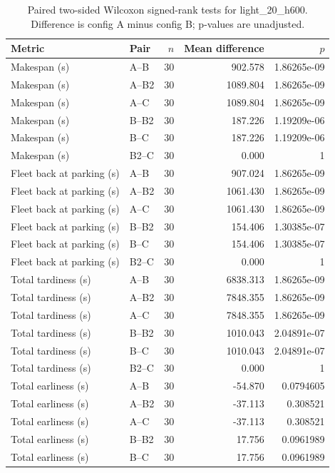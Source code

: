 \begin{table}[t]
\centering
\caption{Paired two-sided Wilcoxon signed-rank tests for light\_20\_h600. Difference is config A minus config B; p-values are unadjusted.}
\label{tab:light-20-h600-paired}
\begin{tabular}{llrrr}
\toprule
Metric & Pair & $n$ & Mean difference & $p$ \\
\midrule
Makespan (s) & A--B & 30 & 902.578 & 1.86265e-09 \\
Makespan (s) & A--B2 & 30 & 1089.804 & 1.86265e-09 \\
Makespan (s) & A--C & 30 & 1089.804 & 1.86265e-09 \\
Makespan (s) & B--B2 & 30 & 187.226 & 1.19209e-06 \\
Makespan (s) & B--C & 30 & 187.226 & 1.19209e-06 \\
Makespan (s) & B2--C & 30 & 0.000 & 1 \\
Fleet back at parking (s) & A--B & 30 & 907.024 & 1.86265e-09 \\
Fleet back at parking (s) & A--B2 & 30 & 1061.430 & 1.86265e-09 \\
Fleet back at parking (s) & A--C & 30 & 1061.430 & 1.86265e-09 \\
Fleet back at parking (s) & B--B2 & 30 & 154.406 & 1.30385e-07 \\
Fleet back at parking (s) & B--C & 30 & 154.406 & 1.30385e-07 \\
Fleet back at parking (s) & B2--C & 30 & 0.000 & 1 \\
Total tardiness (s) & A--B & 30 & 6838.313 & 1.86265e-09 \\
Total tardiness (s) & A--B2 & 30 & 7848.355 & 1.86265e-09 \\
Total tardiness (s) & A--C & 30 & 7848.355 & 1.86265e-09 \\
Total tardiness (s) & B--B2 & 30 & 1010.043 & 2.04891e-07 \\
Total tardiness (s) & B--C & 30 & 1010.043 & 2.04891e-07 \\
Total tardiness (s) & B2--C & 30 & 0.000 & 1 \\
Total earliness (s) & A--B & 30 & -54.870 & 0.0794605 \\
Total earliness (s) & A--B2 & 30 & -37.113 & 0.308521 \\
Total earliness (s) & A--C & 30 & -37.113 & 0.308521 \\
Total earliness (s) & B--B2 & 30 & 17.756 & 0.0961989 \\
Total earliness (s) & B--C & 30 & 17.756 & 0.0961989 \\

\end{tabular}
\end{table}
